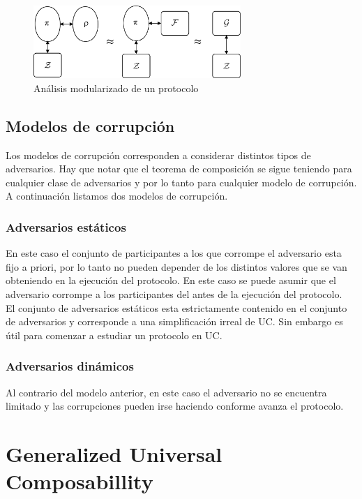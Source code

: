 \begin{figure}[hp]
    \centering
    \includegraphics[width=0.7\textwidth]{figs/dolev_yao}
    \caption{Análisis modularizado de un protocolo}
    \label{fig:proceder_uc}
\end{figure}

\subsection{Modelos de corrupción}

Los modelos de corrupción corresponden a considerar distintos tipos de adversarios. Hay que notar
que el teorema de composición se sigue teniendo para cualquier clase de adversarios y por lo tanto
para cualquier modelo de corrupción.
A continuación listamos dos modelos de corrupción.

\subsubsection{Adversarios estáticos}
En este caso el conjunto de participantes a los que corrompe el adversario esta fijo a priori, por
lo tanto no pueden depender de los distintos valores que se van obteniendo en la ejecución del
protocolo. En este caso se puede asumir que el adversario corrompe a los participantes del
antes de la ejecución del protocolo.\\
El conjunto de adversarios estáticos esta estrictamente contenido en el conjunto de adversarios
y corresponde a una simplificación irreal de UC. Sin embargo es útil para comenzar a estudiar
un protocolo en UC.

\subsubsection{Adversarios dinámicos}
Al contrario del modelo anterior, en este caso el adversario no se encuentra limitado y las corrupciones
pueden irse haciendo conforme avanza el protocolo.


\section{Generalized Universal Composabillity}
